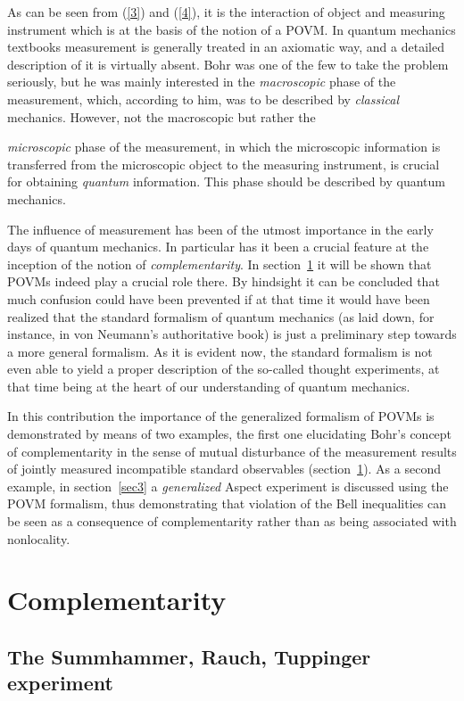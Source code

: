 \documentclass[12pt]{article}
\begin{document}
As can be seen from (\ref{3}) and  (\ref{4}), it is the
interaction of object and measuring instrument which is at the
basis of the notion of a POVM. In quantum mechanics textbooks
measurement is generally treated in an axiomatic way, and a
detailed description of it is virtually absent. Bohr was one of
the few to take the problem seriously, but he was mainly
interested in the \textit{macroscopic} phase of the measurement,
which, according to him, was to be described by \textit{classical}
mechanics. However, not the macroscopic but rather the
{\textit{microscopic} phase of the measurement, in which the
microscopic information is transferred from the microscopic object
to the measuring instrument, is crucial for obtaining
\textit{quantum} information. This phase should be described by
quantum mechanics.

The influence of measurement has been of the utmost importance in
the early days of quantum mechanics. In particular has it been a
crucial feature at the inception of the notion of
\textit{complementarity}. In section~\ref{sec2} it will be shown
that POVMs indeed play a crucial role there. By hindsight it can
be concluded that much confusion could have been prevented if at
that time it would have been realized that the standard formalism
of quantum mechanics (as laid down, for instance, in von Neumann's
authoritative book\cite{vN32}) is just a preliminary step towards
a more general formalism. As it is evident now, the standard
formalism is not even able to yield a proper description of the
so-called thought experiments, at that time being at the heart of
our understanding of quantum mechanics\cite{dM2002}.

In this contribution the importance of the generalized formalism
of POVMs is demonstrated by means of two examples, the first one
elucidating Bohr's concept of complementarity in the sense of
mutual disturbance of the measurement results of jointly measured
incompatible standard observables (section~\ref{sec2}). As a
second example, in section~\ref{sec3} a \textit{generalized}
Aspect experiment is discussed using the POVM formalism, thus
demonstrating that violation of the Bell inequalities can be seen
as a consequence of complementarity rather than as being
associated with nonlocality.

\section{Complementarity}\label{sec2}

\subsection{The Summhammer, Rauch, Tuppinger
experiment}\label{sec2.1}

}
\end{document}

